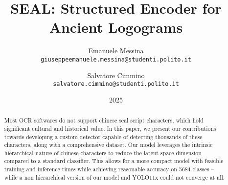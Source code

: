 \documentclass[10pt,twocolumn,letterpaper]{article}
\begin{document}
\title{SEAL: Structured Encoder for Ancient Logograms}
\date{2025}

\author{Emanuele Messina\\
{\tt\small giuseppeemanuele.messina@studenti.polito.it}
\and
Salvatore Cimmino\\
{\tt\small salvatore.cimmino@studenti.polito.it}
}

\maketitle

\begin{abstract}
  Most OCR softwares do not support chinese seal script characters, which hold significant cultural and historical value. In this paper, we present our contributions towards developing a custom detector capable of detecting thousands of these characters, along with a comprehensive dataset. Our model leverages the intrinsic hierarchical nature of chinese characters to reduce the latent space dimension compared to a standard classifier. This allows for a more compact model with feasible training and inference times while achieving reasonable accuracy on 5684 classes -- while a non hierarchical version of our model and YOLO11x could not converge at all.
\end{abstract}








{\small
  
  
}
\end{document}
